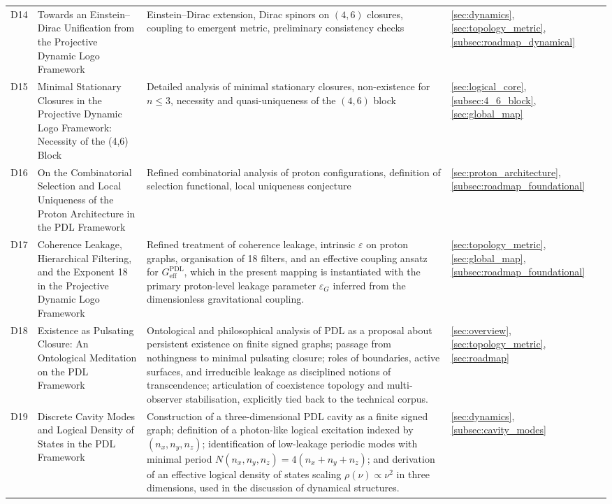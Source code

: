 \documentclass{article}
\newcommand{\PDL}{\mathrm{PDL}}
\begin{document}
\begin{longtable}{@{}p{0.9cm}L{5cm}L{5cm}p{4.4cm}@{}}
  D14 &
  Towards an Einstein--Dirac Unification from the Projective Dynamic Logo Framework &
  Einstein–Dirac extension, Dirac spinors on $(4,6)$ closures, coupling to emergent metric, preliminary consistency checks &
  \ref{sec:dynamics}, \ref{sec:topology_metric}, \ref{subsec:roadmap_dynamical} \\[0.4em]

  D15 &
  Minimal Stationary Closures in the Projective Dynamic Logo Framework: Necessity of the (4,6) Block &
  Detailed analysis of minimal stationary closures, non-existence for $n \leq 3$, necessity and quasi-uniqueness of the $(4,6)$ block &
  \ref{sec:logical_core}, \ref{subsec:4_6_block}, \ref{sec:global_map} \\[0.4em]

  D16 &
  On the Combinatorial Selection and Local Uniqueness of the Proton Architecture in the PDL Framework &
  Refined combinatorial analysis of proton configurations, definition of selection functional, local uniqueness conjecture &
  \ref{sec:proton_architecture}, \ref{subsec:roadmap_foundational} \\[0.4em]

  D17 &
  Coherence Leakage, Hierarchical Filtering, and the Exponent 18 in the Projective Dynamic Logo Framework &
  Refined treatment of coherence leakage, intrinsic $\varepsilon$ on proton graphs, organisation of 18 filters, and an effective coupling ansatz for $G_{\mathrm{eff}}^{\PDL}$, which in the present mapping is instantiated with the primary proton-level leakage parameter $\varepsilon_G$ inferred from the dimensionless gravitational coupling.
 &
  \ref{sec:topology_metric}, \ref{sec:global_map}, \ref{subsec:roadmap_foundational} \\[0.4em] 

  D18 & 
  Existence as Pulsating Closure: An Ontological Meditation on the PDL Framework & Ontological and philosophical analysis of PDL as a proposal about persistent existence on finite signed graphs; passage from nothingness to minimal pulsating closure; roles of boundaries, active surfaces, and irreducible leakage as disciplined notions of transcendence; articulation of coexistence topology and multi-observer stabilisation, explicitly tied back to the technical corpus. & 
  \ref{sec:overview}, \ref{sec:topology_metric}, \ref{sec:roadmap} \\[0.4em] 
  
  D19 & 
  Discrete Cavity Modes and Logical Density of States in the PDL Framework & Construction of a three-dimensional PDL cavity as a finite signed graph; definition of a photon-like logical excitation indexed by $(n_x,n_y,n_z)$; identification of low-leakage periodic modes with minimal period $N(n_x,n_y,n_z)=4(n_x+n_y+n_z)$; and derivation of an effective logical density of states scaling $\rho(\nu)\propto \nu^2$ in three dimensions, used in the discussion of dynamical structures. & 
  \ref{sec:dynamics}, \ref{subsec:cavity_modes} \\[0.4em]


\end{longtable}
\end{document}
